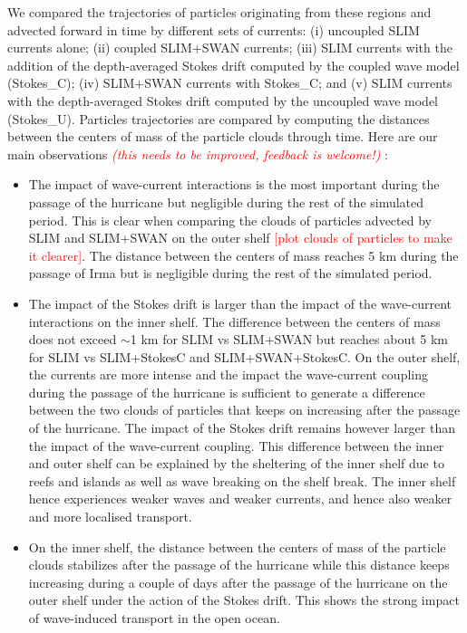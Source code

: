 \documentclass[preprint,12pt,authoryear]{elsarticle}
\newcommand{\emphc}[1]{\emph{\textcolor{red}{#1}}}
\begin{document}
We compared the trajectories of particles originating from these regions and advected forward in time by different sets of currents: (i) uncoupled SLIM currents alone; (ii) coupled SLIM+SWAN currents; (iii) SLIM currents with the addition of the depth-averaged Stokes drift computed by the coupled wave model (Stokes\_C); (iv) SLIM+SWAN currents with Stokes\_C; and (v) SLIM currents with the depth-averaged Stokes drift computed by the uncoupled wave model (Stokes\_U). Particles trajectories are compared by computing the distances between the centers of mass of the particle clouds through time. Here are our main observations \emphc{(this needs to be improved, feedback is welcome!)} : 
\begin{itemize}
    \item The impact of wave-current interactions is the most important during the passage of the hurricane but negligible during the rest of the simulated period. This is clear when comparing the clouds of particles advected by SLIM and SLIM+SWAN on the outer shelf \textcolor{red}{[plot clouds of particles to make it clearer]}. The distance between the centers of mass reaches 5 km during the passage of Irma but is negligible during the rest of the simulated period.
    \item The impact of the Stokes drift is larger than the impact of the wave-current interactions on the inner shelf. The difference between the centers of mass does not exceed $\sim$1 km for SLIM vs SLIM+SWAN but reaches about 5 km for SLIM vs SLIM+Stokes\textunderscore C and SLIM+SWAN+Stokes\textunderscore C. On the outer shelf, the currents are more intense and the impact the wave-current coupling during the passage of the hurricane is sufficient to generate a difference between the two clouds of particles that keeps on increasing after the passage of the hurricane. The impact of the Stokes drift remains however larger than the impact of the wave-current coupling. This difference between the inner and outer shelf can be explained by the sheltering of the inner shelf due to reefs and islands as well as wave breaking on the shelf break. The inner shelf hence experiences weaker waves and weaker currents, and hence also weaker and more localised transport. 
    \item On the inner shelf, the distance between the centers of mass of the particle clouds stabilizes after the passage of the hurricane while this distance keeps increasing during a couple of days after the passage of the hurricane on the outer shelf under the action of the Stokes drift. This shows the strong impact of wave-induced transport in the open ocean. 

\end{itemize}
\end{document}
